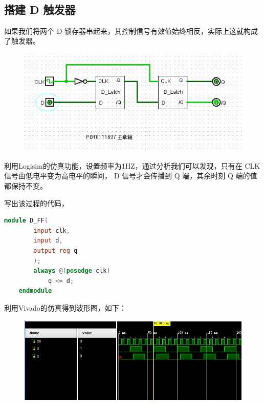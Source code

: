 \documentclass[UTF8]{article}
\begin{document}
\begin{figure}[H]
\begin{minipage}[H]{0.49\linewidth}
			\label{D_Latch_Lock_1}
		\end{minipage}\\
	\end{figure}



	\subsection{搭建 D 触发器}
	如果我们将两个 D 锁存器串起来，其控制信号有效值始终相反，实际上这就构成了触发器。\par
	\begin{figure}[H]
		\centering
		\includegraphics[width=1\linewidth]{D_FF.jpg}
		\label{D_FF}
	\end{figure}
	利用Logisim的仿真功能，设置频率为1HZ，通过分析我们可以发现，只有在 CLK 信号由低电平变为高电平的瞬间， D 信号才会传播到 Q 端，其余时刻 Q 端的值都保持不变。\par
	写出该过程的代码，\par
	\begin{lstlisting}[language=Verilog]
	module D_FF(
		input clk,
		input d,
		output reg q
		);
		always @(posedge clk)
			q <= d;
	endmodule	
	\end{lstlisting}
	利用Vivado的仿真得到波形图，如下：
	\begin{figure}[H]
		\centering
		\includegraphics[width=1\linewidth]{D_FF_Oscillogram.jpg}
		\label{D_FF_Oscillogram}
	\end{figure}
\end{document}
